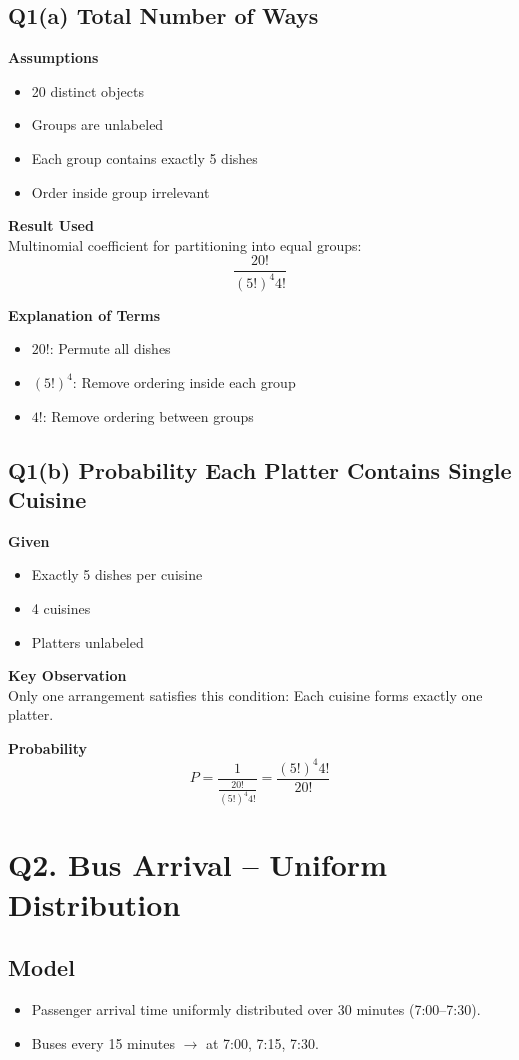 \documentclass[11pt]{article}
\begin{document}
\subsection{Q1(a) Total Number of Ways}
\textbf{Assumptions}
\begin{itemize}
    \item 20 distinct objects
    \item Groups are unlabeled
    \item Each group contains exactly 5 dishes
    \item Order inside group irrelevant
\end{itemize}

\textbf{Result Used} \\
Multinomial coefficient for partitioning into equal groups:
\[ \frac{20!}{(5!)^4 4!} \]

\textbf{Explanation of Terms}
\begin{itemize}
    \item $20!$: Permute all dishes
    \item $(5!)^4$: Remove ordering inside each group
    \item $4!$: Remove ordering between groups
\end{itemize}

\subsection{Q1(b) Probability Each Platter Contains Single Cuisine}
\textbf{Given}
\begin{itemize}
    \item Exactly 5 dishes per cuisine
    \item 4 cuisines
    \item Platters unlabeled
\end{itemize}

\textbf{Key Observation} \\
Only one arrangement satisfies this condition: Each cuisine forms exactly one platter.

\textbf{Probability}
\[ P = \frac{1}{\frac{20!}{(5!)^4 4!}} = \frac{(5!)^4 4!}{20!} \]

\section{Q2. Bus Arrival – Uniform Distribution}

\subsection{Model}
\begin{itemize}
    \item Passenger arrival time uniformly distributed over 30 minutes (7:00–7:30).
    \item Buses every 15 minutes $\rightarrow$ at 7:00, 7:15, 7:30.
\end{itemize}
\end{document}

